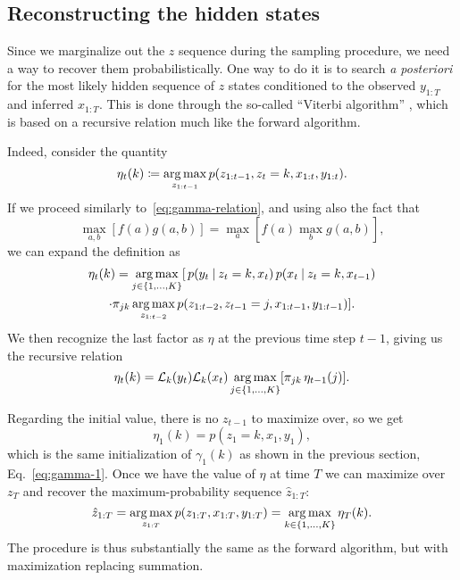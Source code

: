 \documentclass[
  10pt, twocolumn, headings=normal,
  footlines=1, DIV=calc
]{scrartcl}
\begin{document}
\subsection{Reconstructing the hidden states}
Since we marginalize out the $z$ sequence during the sampling procedure, we need
a way to recover them probabilistically. One way to do it is to search \emph{a
posteriori} for the most likely hidden sequence of $z$ states conditioned to the
observed $y_{1:T}$ and inferred $x_{1:T}$. This is done through the so-called
\enquote{Viterbi algorithm} \autocite{Stan24}, which is based on a recursive
relation much like the forward algorithm.

Indeed, consider the quantity
\begin{equation}
  \eta_{t}(k) \coloneq \operatorname*{arg\,max}_{z_{1:t-1}}
    p(z_{1:t-1}, z_{t} = k, x_{1:t}, y_{1:t}).
\end{equation}
If we proceed similarly to~\eqref{eq:gamma-relation}, and using also the fact
that
\begin{equation}
  \max_{a,b} [f(a) g(a, b)] = \max_{a}[f(a) \max_{b} g(a, b)],
\end{equation}
we can expand the definition as
\begin{multline}
  \eta_{t}(k) = \operatorname*{arg\,max}_{j \in \{1, \ldots, K\}}
    [\, p(y_{t} \:\vert\: z_{t} = k, x_{t}) \,
    p(x_{t} \:\vert\: z_{t} = k, x_{t-1}) \\
    \cdot \pi_{jk} \operatorname*{arg\,max}_{z_{1:t-2}}
    p(z_{1:t-2}, z_{t-1} = j, x_{1:t-1}, y_{1:t-1})].
\end{multline}
We then recognize the last factor as $\eta$ at the previous time step $t-1$,
giving us the recursive relation
\begin{equation}
  \eta_{t}(k) = \mathcal{L}_{k}(y_{t}) \mathcal{L}_{k}(x_{t})
  \operatorname*{arg\,max}_{j \in \{1, \ldots, K\}} [ \pi_{jk} \, \eta_{t-1}(j)].
\end{equation}

Regarding the initial value, there is no $z_{t-1}$ to maximize over, so we get
\begin{equation}
  \eta_{1}(k) = p(z_{1} = k, x_{1}, y_{1}),
\end{equation}
which is the same initialization of $\gamma_{1}(k)$ as shown in the previous
section, Eq.~\eqref{eq:gamma-1}. Once we have the value of $\eta$ at time $T$ we
can maximize over $z_{T}$ and recover the maximum-probability sequence
$\hat{z}_{1:T}$:
\begin{equation}
  \hat{z}_{1:T} = 
  \operatorname*{arg\,max}_{z_{1:T}} p(z_{1:T}, x_{1:T}, y_{1:T}) =
  \operatorname*{arg\,max}_{k \in \{1, \ldots, K\}} \eta_{T}(k).
\end{equation}
The procedure is thus substantially the same as the forward algorithm, but with
maximization replacing summation.
\end{document}
